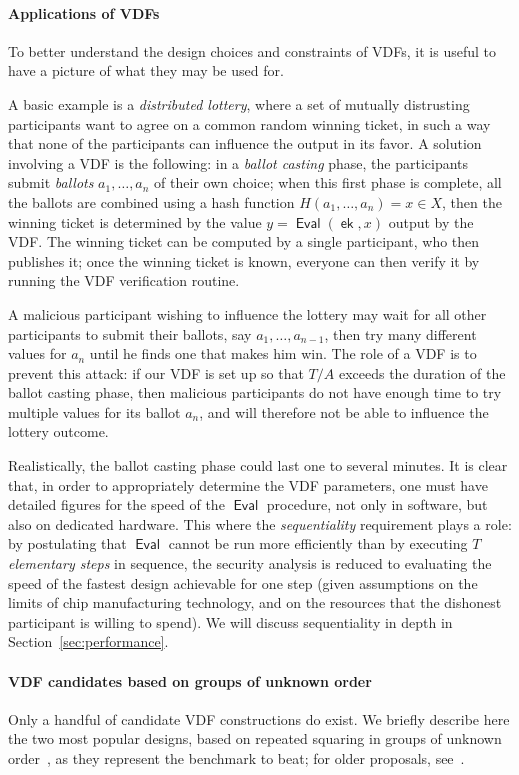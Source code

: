 \documentclass{article}
\DeclareMathOperator{\Eval}{\mathsf{Eval}}
\DeclareMathOperator{\ek}{\mathsf{ek}}
\begin{document}
\paragraph{Applications of VDFs}
To better understand the design choices and constraints of VDFs, 
it is useful to have a picture of what they may be used for. %

A basic example is a \emph{distributed lottery}, where a set of
mutually distrusting participants want to agree on a common random
winning ticket, in such a way that none of the participants can
influence the output in its favor. %
A solution involving a VDF is the following: 
in a \emph{ballot casting} phase, the participants submit
\emph{ballots} $a_1,\ldots,a_n$ of their own choice; 
when this first phase is complete, all the ballots are combined using
a hash function $H(a_1,\dots,a_n) = x ∈ X$, then the winning ticket
is determined by the value $y = \Eval(\ek,x)$ output by the VDF. %
The winning ticket can be computed by a single participant, who then
publishes it; once the winning ticket is known, everyone can then
verify it by running the VDF verification routine.

A malicious participant wishing to influence the lottery may wait
for all other participants to submit their ballots, say
$a_1,\dots,a_{n-1}$, then try many different values for $a_n$ until
he finds one that makes him win. %
The role of a VDF is to prevent this attack:  if our VDF is set up
so that $T/A$ exceeds the duration of the ballot casting phase,
then malicious participants do not have enough time to try multiple
values for its ballot $a_n$, and will therefore not be able to
influence the lottery outcome.

Realistically, the ballot casting phase could last one to several
minutes. %
It is clear that, in order to appropriately determine the VDF
parameters, one must have detailed figures for the speed of the
$\Eval$ procedure, not only in software, but also on dedicated
hardware. %
This where the \emph{sequentiality} requirement plays a role: by
postulating that $\Eval$ cannot be run more efficiently than by
executing $T$ \emph{elementary steps} in sequence, the security
analysis is reduced to evaluating the speed of the fastest design
achievable for one step (given assumptions on the limits of chip
manufacturing technology, and on the resources that the dishonest
participant is willing to spend). %
We will discuss sequentiality in depth in
Section~\ref{sec:performance}.

\paragraph{VDF candidates based on groups of unknown order}
Only a handful of candidate VDF constructions do exist. %
We briefly describe here the two most popular designs, based on
repeated squaring in groups of unknown
order~\cite{Wesolowski,Pietrzak}, as they represent the benchmark to
beat; for older proposals, see~\cite{Boneh}.
\end{document}
